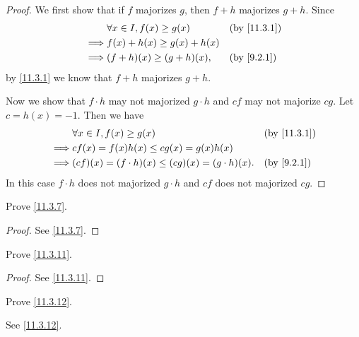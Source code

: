 \begin{proof}
  We first show that if \(f\) majorizes \(g\), then \(f + h\) majorizes \(g + h\).
  Since
  \begin{align*}
             & \forall x \in I, f(x) \geq g(x) &  & \text{(by \cref{11.3.1})} \\
    \implies & f(x) + h(x) \geq g(x) + h(x)                                   \\
    \implies & (f + h)(x) \geq (g + h)(x),     &  & \by{9.2.1}
  \end{align*}
  by \cref{11.3.1} we know that \(f + h\) majorizes \(g + h\).

  Now we show that \(f \cdot h\) may not majorized \(g \cdot h\) and \(cf\) may not majorize \(cg\).
  Let \(c = h(x) = -1\).
  Then we have
  \begin{align*}
             & \forall x \in I, f(x) \geq g(x)                         &  & \text{(by \cref{11.3.1})} \\
    \implies & cf(x) = f(x) h(x) \leq cg(x) = g(x) h(x)                                               \\
    \implies & (cf)(x) = (f \cdot h)(x) \leq (cg)(x) = (g \cdot h)(x). &  & \by{9.2.1}
  \end{align*}
  In this case \(f \cdot h\) does not majorized \(g \cdot h\) and \(cf\) does not majorized \(cg\).
\end{proof}

\begin{ex}\label{ex:11.3.3}
  Prove \cref{11.3.7}.
\end{ex}

\begin{proof}
  See \cref{11.3.7}.
\end{proof}

\begin{ex}\label{ex:11.3.4}
  Prove \cref{11.3.11}.
\end{ex}

\begin{proof}
  See \cref{11.3.11}.
\end{proof}

\begin{ex}\label{ex:11.3.5}
  Prove \cref{11.3.12}.
\end{ex}

\begin{prop}
  See \cref{11.3.12}.
\end{prop}